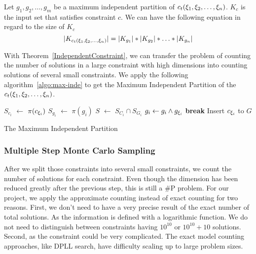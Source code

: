 \begin{theorem}
      \label{IndependentConstraint}
Let $g_{1}, g_{2}, \ldots, g_{m}$ be a maximum independent partition of 
$c_t({\xi}_{1},{\xi}_{2},\ldots,{\xi}_{n})$.
$K_c$ is the input set that satisfies constraint $c$. We can have the following
equation in regard to the size of $K_c$
$$|K_{c_t({\xi}_{1},{\xi}_{2},\ldots,{\xi}_{n})}| = |K_{g_{1}}|*|K_{g_{2}}|*\ldots*|K_{g_{n}}|$$
\end{theorem}

With Theorem~\ref{IndependentConstraint}, we can transfer the problem of counting the number of 
solutions in a large constraint with high
dimensions into counting solutions of 
several small constraints. We apply the following algorithm~\ref{algo:max-inde} to get the 
Maximum Independent Partition
of the $c_t({\xi}_{1},{\xi}_{2},\ldots,{\xi}_{n})$.

\IncMargin{1em}
\begin{algorithm}[h]
\DontPrintSemicolon
{}
{
   $S_{c_i}$ $\leftarrow$ $\pi(c_{{\xi}_{i}})$ \;
   {
   $S_{g_i}$ $\leftarrow$ $\pi(g_{i})$ \;
   $S$ $\leftarrow$ $S_{C_i} \cap S_{G_i}$  \;
   {
      $g_{i} \leftarrow g_{i} \land g_{{\xi}_{i}}$ \;
      \textbf{break} \;
   }
   Insert $c_{{\xi}_{i}}$ to $G$
   }
}
\caption{The Maximum Independent Partition}
\label{algo:max-inde}
\end{algorithm}
\DecMargin{1em}

\subsubsection{Multiple Step Monte Carlo Sampling}

After we split those constraints into several small constraints, we count
the number of solutions for each constraint. Even though the dimension
has been reduced greatly after the previous step, this is still a
\#P problem. For our project, we apply the approximate counting instead of
exact counting for two reasons. First, we don't need to have a very precise
result of the exact number of total solutions. As the information is defined with
a logarithmic function. We do not need to distinguish between constraints having
$10^{10}$ or $10^{10} + 10$ solutions.
Second, as the constraint could be very complicated. The exact model counting
approaches, like DPLL search, have difficulty scaling up to large problem sizes.

